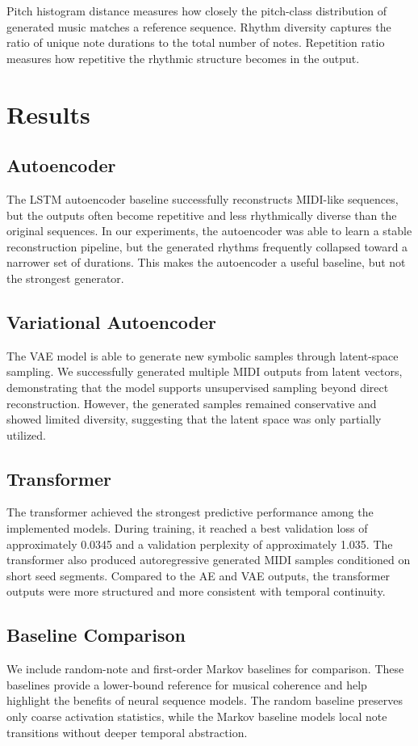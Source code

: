 \documentclass[conference]{IEEEtran}
\begin{document}
Pitch histogram distance measures how closely the pitch-class distribution of generated music matches a reference sequence. Rhythm diversity captures the ratio of unique note durations to the total number of notes. Repetition ratio measures how repetitive the rhythmic structure becomes in the output.

\section{Results}

\subsection{Autoencoder}
The LSTM autoencoder baseline successfully reconstructs MIDI-like sequences, but the outputs often become repetitive and less rhythmically diverse than the original sequences. In our experiments, the autoencoder was able to learn a stable reconstruction pipeline, but the generated rhythms frequently collapsed toward a narrower set of durations. This makes the autoencoder a useful baseline, but not the strongest generator.

\subsection{Variational Autoencoder}
The VAE model is able to generate new symbolic samples through latent-space sampling. We successfully generated multiple MIDI outputs from latent vectors, demonstrating that the model supports unsupervised sampling beyond direct reconstruction. However, the generated samples remained conservative and showed limited diversity, suggesting that the latent space was only partially utilized.

\subsection{Transformer}
The transformer achieved the strongest predictive performance among the implemented models. During training, it reached a best validation loss of approximately 0.0345 and a validation perplexity of approximately 1.035. The transformer also produced autoregressive generated MIDI samples conditioned on short seed segments. Compared to the AE and VAE outputs, the transformer outputs were more structured and more consistent with temporal continuity.

\subsection{Baseline Comparison}
We include random-note and first-order Markov baselines for comparison. These baselines provide a lower-bound reference for musical coherence and help highlight the benefits of neural sequence models. The random baseline preserves only coarse activation statistics, while the Markov baseline models local note transitions without deeper temporal abstraction.
\end{document}
